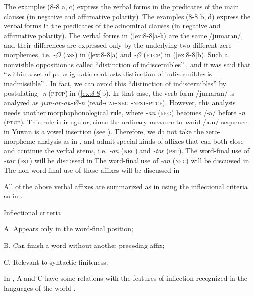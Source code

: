 The examples (8-8 a, c) express the verbal forms in the predicates of the main clauses (in negative and affirmative polarity). The examples (8-8 b, d) express the verbal forms in the predicates of the adnominal clauses (in negative and affirmative polarity). The verbal forms in (\ref{ex:8-8}a-b) are the same /jumaran/, and their differences are expressed only by the underlying two different zero morphemes, i.e. \textit{-Ø} (\textsc{ass}) in (\ref{ex:8-8}a) and \textit{-Ø} (\textsc{ptcp}) in (\ref{ex:8-8}b). Such a nonvisible opposition is called “distinction of indiscernibles” \citep[36]{Haas1974}, and it was said that “within a set of paradigmatic contrasts distinction of indiscernibles is inadmissible” \citep[83]{McGregor2003}. In fact, we can avoid this “distinction of indiscernibles” by postulating \textit{-n} (\textsc{ptcp}) in (\ref{ex:8-8}b). In that case, the verb form /jumaran/ is analyzed as \textit{jum-ar-an-Ø-n} (read-\textsc{cap}-\textsc{neg} -\textsc{npst}-\textsc{ptcp}). However, this analysis needs another morphophonological rule, where \textit{-an} (\textsc{neg}) becomes /-a/ before \textit{-n} (\textsc{ptcp}). This rule is irregular, since the ordinary measure to avoid /n.n/ sequence in Yuwan is a vowel insertion (see ). Therefore, we do not take the zero-morpheme analysis as in , and admit special kinds of affixes that can both close and continue the verbal stems, i.e. \textit{-an} (\textsc{neg}) and \textit{-tar} (\textsc{pst}). The word-final use of \textit{-tar} (\textsc{pst}) will be discussed in  The word-final use of \textit{-an} (\textsc{neg}) will be discussed in  The non-word-final use of these affixes will be discussed in 

  All of the above verbal affixes are summarized as in  using the inflectional criteria as in .

\ea\label{ex:8-9}
  Inflectional criteria

  A.  Appears only in the word-final position;

  B.  Can finish a word without another preceding affix;

  C.  Relevant to syntactic finiteness.
\z

In , A and C have some relations with the features of inflection recognized in the languages of the world \citep[90]{Haspelmath2010}.

